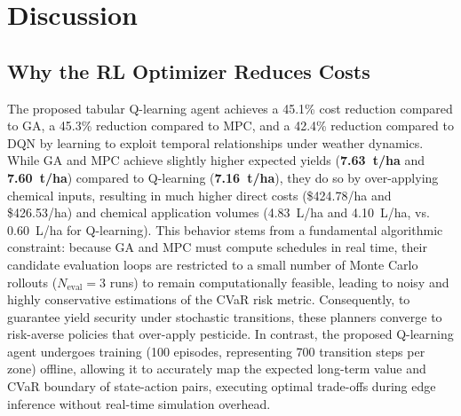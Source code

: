 \documentclass[review,3p,times,authoryear]{elsarticle}
\begin{document}
\section{Discussion}

\subsection{Why the RL Optimizer Reduces Costs}
The proposed tabular Q-learning agent achieves a 45.1\% cost reduction compared to GA, a 45.3\% reduction compared to MPC, and a 42.4\% reduction compared to DQN by learning to exploit temporal relationships under weather dynamics. While GA and MPC achieve slightly higher expected yields (\textbf{7.63~t/ha} and \textbf{7.60~t/ha}) compared to Q-learning (\textbf{7.16~t/ha}), they do so by over-applying chemical inputs, resulting in much higher direct costs (\$424.78/ha and \$426.53/ha) and chemical application volumes (4.83~L/ha and 4.10~L/ha, vs. 0.60~L/ha for Q-learning). This behavior stems from a fundamental algorithmic constraint: because GA and MPC must compute schedules in real time, their candidate evaluation loops are restricted to a small number of Monte Carlo rollouts ($N_{\text{eval}} = 3$ runs) to remain computationally feasible, leading to noisy and highly conservative estimations of the CVaR risk metric. Consequently, to guarantee yield security under stochastic transitions, these planners converge to risk-averse policies that over-apply pesticide. In contrast, the proposed Q-learning agent undergoes training (100 episodes, representing 700 transition steps per zone) offline, allowing it to accurately map the expected long-term value and CVaR boundary of state-action pairs, executing optimal trade-offs during edge inference without real-time simulation overhead.
\end{document}
